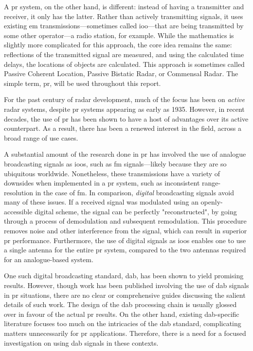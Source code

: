 \documentclass[class=report,11pt,crop=false]{standalone}
\begin{document}
A \gls{pr} system, on the other hand, is different: instead of having a transmitter and receiver, it only has the latter. Rather than actively transmitting signals, it uses existing \gls{em} transmissions---sometimes called \gls{ioo}---that are being transmitted by some other operator---a radio station, for example. While the mathematics is slightly more complicated for this approach, the core idea remains the same: reflections of the transmitted signal are measured, and using the calculated time delays, the locations of objects are calculated. This approach is sometimes called Passive Coherent Location, Passive Bistatic Radar, or Commensal Radar. The simple term, \gls{pr}, will be used throughout this report.

For the past century of radar development, much of the focus has been on \emph{active} radar systems, despite \gls{pr} systems appearing as early as 1935. However, in recent decades, the use of \gls{pr} has been shown to have a host of advantages over its active counterpart. As a result, there has been a renewed interest in the field, across a broad range of use cases.

A substantial amount of the research done in \gls{pr} has involved the use of analogue broadcasting signals as \gls{ioo}s, such as \gls{fm} signals---likely because they are so ubiquitous worldwide. Nonetheless, these transmissions have a variety of downsides when implemented in a \gls{pr} system, such as inconsistent range-resolution in the case of \gls{fm}. In comparison, \emph{digital} broadcasting signals avoid many of these issues. If a received signal was modulated using an openly-accessible digital scheme, the signal can be perfectly "reconstructed", by going through a process of demodulation and subsequent remodulation. This procedure removes noise and other interference from the signal, which can result in superior \gls{pr} performance. Furthermore, the use of digital signals as \gls{ioo}s enables one to use a single antenna for the entire \gls{pr} system, compared to the two antennas required for an analogue-based system.

One such digital broadcasting standard, \gls{dab}, has been shown to yield promising results.  However, though work has been published involving the use of \gls{dab} signals in \gls{pr} situations, there are no clear or comprehensive guides discussing the salient details of such work. The design of the \gls{dab} processing chain is usually glossed over in favour of the actual \gls{pr} results. On the other hand, existing \gls{dab}-specific literature focuses too much on the intricacies of the \gls{dab} standard, complicating matters unnecessarily for \gls{pr} applications. Therefore, there is a need for a focused investigation on using \gls{dab} signals in these contexts.
\end{document}

